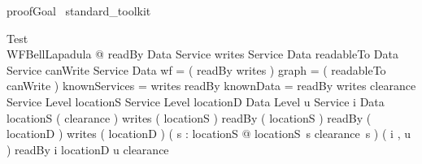 \begin{zsection}	 \SECTION proofGoal \parents~standard\_toolkit
\end{zsection}



\begin{theorem}{ Test}\\
 \forall WFBellLapadula @ readBy \in Data \rel Service \land writes \in Service \rel Data \land readableTo \in Data \rel Service \land canWrite \in Service \rel Data \land wf = ( readBy \comp writes ) \plus \land graph = ( readableTo \comp canWrite ) \plus \land knownServices = \dom writes \cup \ran readBy \land knownData = \dom readBy \cup \ran writes \land clearance \in Service \pfun Level \land locationS \in Service \pfun Level \land locationD \in Data \pfun Level \land u \in Service \land i \in Data \land \dom locationS \in \power ( \dom clearance ) \land \dom writes \in \power ( \dom locationS ) \land \ran readBy \in \power ( \dom locationS ) \land \dom readBy \in \power ( \dom locationD ) \land \ran writes \in \power ( \dom locationD ) \land ( \forall s : \dom locationS @ locationS~s \leq clearance~s ) \land ( i , u ) \in readBy \implies i \in \dom locationD \land u \in \dom clearance \\

\end{theorem}



